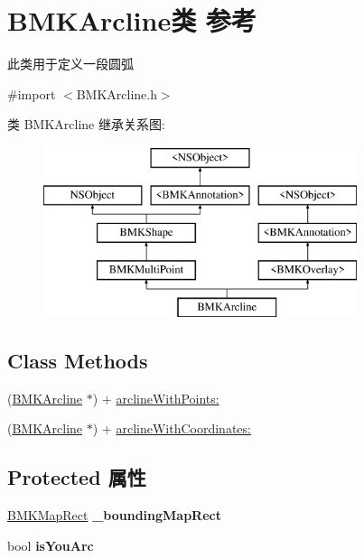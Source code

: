 \hypertarget{interface_b_m_k_arcline}{}\section{B\+M\+K\+Arcline类 参考}
\label{interface_b_m_k_arcline}


此类用于定义一段圆弧  




{\ttfamily \#import $<$B\+M\+K\+Arcline.\+h$>$}

类 B\+M\+K\+Arcline 继承关系图\+:\begin{figure}[H]
\begin{center}
\leavevmode
\includegraphics[height=5.000000cm]{interface_b_m_k_arcline}
\end{center}
\end{figure}
\subsection*{Class Methods}
\begin{DoxyCompactItemize}
\item 
(\hyperlink{interface_b_m_k_arcline}{B\+M\+K\+Arcline} $\ast$) + \hyperlink{interface_b_m_k_arcline_ad439d6682d48b51c0b04e84772a38a79}{arcline\+With\+Points\+:}
\item 
(\hyperlink{interface_b_m_k_arcline}{B\+M\+K\+Arcline} $\ast$) + \hyperlink{interface_b_m_k_arcline_a34a5daa9fc480861aa52e2ef5b0ccb3a}{arcline\+With\+Coordinates\+:}
\end{DoxyCompactItemize}
\subsection*{Protected 属性}
\begin{DoxyCompactItemize}
\item 
\hypertarget{interface_b_m_k_arcline_abbb8f0dba8c81ab8bcd8cc8e587d51cf}{}\hyperlink{struct_b_m_k_map_rect}{B\+M\+K\+Map\+Rect} {\bfseries \+\_\+bounding\+Map\+Rect}\label{interface_b_m_k_arcline_abbb8f0dba8c81ab8bcd8cc8e587d51cf}

\item 
\hypertarget{interface_b_m_k_arcline_ae74be329c0bfedce99b890f70d3b871e}{}bool {\bfseries is\+You\+Arc}\label{interface_b_m_k_arcline_ae74be329c0bfedce99b890f70d3b871e}

\end{DoxyCompactItemize}
